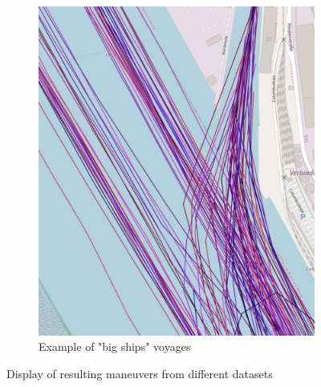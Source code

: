 \begin{figure}[H]
\begin{subfigure}[b]{0.48\textwidth}
            \includegraphics[width=\textwidth]{images/ais/tracks/big_ships_entering.png}
         \caption{Example of "big ships" voyages}
     \end{subfigure}
     \label{fig:cargoAndBig}
     \caption{Display of resulting maneuvers from different datasets}
\end{figure}


